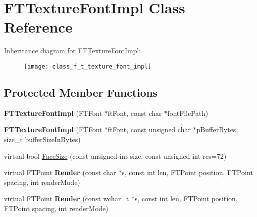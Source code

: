 \hypertarget{class_f_t_texture_font_impl}{\section{F\-T\-Texture\-Font\-Impl Class Reference}
\label{class_f_t_texture_font_impl}
}
Inheritance diagram for F\-T\-Texture\-Font\-Impl\-:\begin{figure}[H]
\begin{center}
\leavevmode
\texttt{[image: class\_f\_t\_texture\_font\_impl]}
\end{center}
\end{figure}
\subsection*{Protected Member Functions}
\begin{DoxyCompactItemize}
\item 
\hypertarget{class_f_t_texture_font_impl_a6e5537e5ce6f58e8f8244c9d0cd44d9f}{{\bfseries F\-T\-Texture\-Font\-Impl} (F\-T\-Font $\ast$ft\-Font, const char $\ast$font\-File\-Path)}\label{class_f_t_texture_font_impl_a6e5537e5ce6f58e8f8244c9d0cd44d9f}

\item 
\hypertarget{class_f_t_texture_font_impl_a4554181466170efa12b9a12e4936b61d}{{\bfseries F\-T\-Texture\-Font\-Impl} (F\-T\-Font $\ast$ft\-Font, const unsigned char $\ast$p\-Buffer\-Bytes, size\-\_\-t buffer\-Size\-In\-Bytes)}\label{class_f_t_texture_font_impl_a4554181466170efa12b9a12e4936b61d}

\item 
virtual bool \hyperlink{class_f_t_texture_font_impl_ac5ccaca6cc8a53292b5028a629e49244}{Face\-Size} (const unsigned int size, const unsigned int res=72)
\item 
\hypertarget{class_f_t_texture_font_impl_a8b53cbe2b70ad38af59a7d79945122d9}{virtual F\-T\-Point {\bfseries Render} (const char $\ast$s, const int len, F\-T\-Point position, F\-T\-Point spacing, int render\-Mode)}\label{class_f_t_texture_font_impl_a8b53cbe2b70ad38af59a7d79945122d9}

\item 
\hypertarget{class_f_t_texture_font_impl_aba852ac4cc9b759073b6370e059e6c11}{virtual F\-T\-Point {\bfseries Render} (const wchar\-\_\-t $\ast$s, const int len, F\-T\-Point position, F\-T\-Point spacing, int render\-Mode)}\label{class_f_t_texture_font_impl_aba852ac4cc9b759073b6370e059e6c11}

\end{DoxyCompactItemize}
